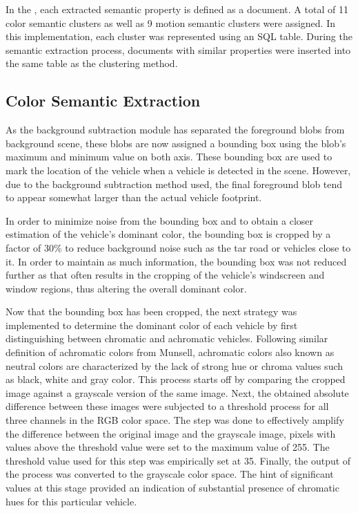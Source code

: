 In the \versionOneExt, each extracted semantic property is defined as a document. A total of 11 color semantic clusters as well as 9 motion semantic clusters were assigned. In this implementation, each cluster was represented using an SQL table. During the semantic extraction process, documents with similar properties were inserted into the same table as the clustering method. 


\subsection{Color Semantic Extraction }
\label{section:versionOneColorExtract}

As the background subtraction module has separated the foreground blobs from background scene, these blobs are now assigned a bounding box using the blob's maximum and minimum value on both axis. These bounding box are used to mark the location of the vehicle when a vehicle is detected in the scene. However, due to the background subtraction method used, the final foreground blob tend to appear somewhat larger than the actual vehicle footprint. 

In order to minimize noise from the bounding box and to obtain a closer estimation of the vehicle's dominant color, the bounding box is cropped by a factor of 30\% to reduce background noise such as the tar road or vehicles close to it. In order to maintain as much information, the bounding box was not reduced further as that often results in the cropping of the vehicle's windscreen and window regions, thus altering the overall dominant color.

Now that the bounding box has been cropped, the next strategy was implemented to determine the dominant color of each vehicle by first distinguishing between chromatic and achromatic vehicles. Following similar definition of achromatic colors from Munsell, achromatic colors also known as neutral colors are characterized by the lack of strong hue or chroma values such as black, white and gray color. This process starts off by comparing the cropped image against a grayscale version of the same image. Next, the obtained absolute difference between these images were subjected to a threshold process for all three channels in the RGB color space. The step was done to effectively amplify the difference between the original image and the grayscale image, pixels with values above the threshold value were set to the maximum value of 255. The threshold value used for this step was empirically set at 35. Finally, the output of the process was converted to the grayscale color space. The hint of significant values at this stage provided an indication of substantial presence of chromatic hues for this particular vehicle.     

